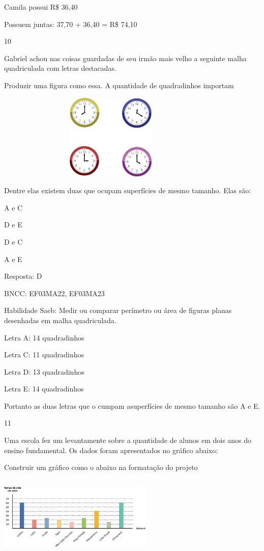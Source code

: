 \begin{escolha}
\begin{escolha}
Camila possui R\$ 36,40

Possuem juntas: 37,70 + 36,40 = R\$ 74,10

\num{10}

Gabriel achou nas coisas guardadas de seu irmão mais velho a seguinte
malha quadriculada com letras destacadas.

Produzir uma figura como essa. A quantidade de quadradinhos importam

\includegraphics[width=4.36538in,height=1.60417in]{media/image111.png}

Dentre elas existem duas que ocupam superfícies de mesmo tamanho. Elas
são:

\begin{escolha}
\item
  A e C
\item
  D e E
\item
  D e C
\item
  A e E
\end{escolha}

Resposta: D

BNCC: EF03MA22, EF03MA23

Habilidade Saeb: Medir ou comparar perímetro ou área de figuras planas
desenhadas em malha quadriculada.

Letra A: 14 quadradinhos

Letra C: 11 quadradinhos

Letra D: 13 quadradinhos

Letra E: 14 quadradinhos

Portanto as duas letras que o cumpam asuperfícies de mesmo tamanho são A
e E.

\num{11}

Uma escola fez um levantamente sobre a quantidade de alunos em dois anos
do ensino fundamental. Os dados foram apresentados no gráfico abaixo:

Construir um gráfico como o abaixo na formatação do projeto

\includegraphics[width=2.89744in,height=1.52156in]{media/image112.png}


\end{escolha}
\end{escolha}
